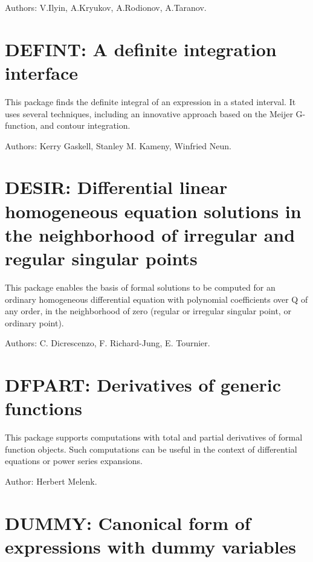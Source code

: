 Authors: V.Ilyin, A.Kryukov, A.Rodionov, A.Taranov.



\newpage

\section{DEFINT: A definite integration interface}
\label{DEFINT}

This package finds the definite integral of an expression in a stated
interval.  It uses several techniques, including an innovative approach
based on the Meijer G-function, and contour integration.

Authors: Kerry Gaskell, Stanley M. Kameny, Winfried Neun.



\newpage

\section{DESIR: Differential linear homogeneous equation solutions in the
              neighborhood of irregular and regular singular points}

This package enables the basis of formal solutions to be computed for an
ordinary homogeneous differential equation with polynomial coefficients
over Q of any order, in the neighborhood of zero (regular or irregular
singular point, or ordinary point).

Authors: C. Dicrescenzo, F. Richard-Jung, E. Tournier.



\newpage

\section{DFPART: Derivatives of generic functions}

This package supports computations with total and partial derivatives of
formal function objects.  Such computations can be useful in the context
of differential equations or power series expansions.

Author: Herbert Melenk.



\newpage

\section{DUMMY: Canonical form of expressions with dummy variables}

